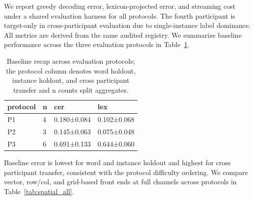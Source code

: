 \documentclass{Interspeech}
\begin{document}
We report greedy decoding error, lexicon-projected error, and streaming cost under a shared evaluation harness for all protocols. The fourth participant is target-only in cross-participant evaluation due to single-instance label dominance. All metrics are derived from the same audited registry.
We summarize baseline performance across the three evaluation protocols in Table~\ref{tab:main}.
\begin{table}[H]
\centering
\small
\setlength{\tabcolsep}{4pt}
\caption{Baseline recap across evaluation protocols; the protocol column denotes word holdout, instance holdout, and cross participant transfer and n counts split aggregates.}
\label{tab:main}
\begin{tabular*}{\columnwidth}{@{\extracolsep{\fill}}llll}
\hline
protocol & n & cer & lex \\
\hline
P1 & 4 & 0.180±0.084 & 0.102±0.068 \\
P2 & 3 & 0.145±0.063 & 0.075±0.048 \\
P3 & 6 & 0.691±0.133 & 0.644±0.060 \\
\hline
\end{tabular*}
\end{table}
Baseline error is lowest for word and instance holdout and highest for cross participant transfer, consistent with the protocol difficulty ordering.
We compare vector, row/col, and grid-based front ends at full channels across protocols in Table~\ref{tab:spatial_all}.
\end{document}
